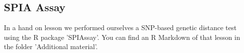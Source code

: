 \subsection*{SPIA Assay}
In a hand on lesson we performed ourselves a SNP-based genetic distance test using the R package 'SPIAssay'. You can find an R Markdown of that lesson in the folder 'Additional material'. 

%
%




